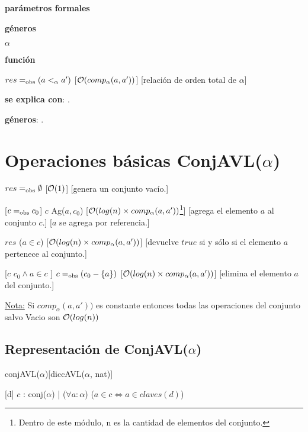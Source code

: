 \begin{Interfaz}
  \textbf{parámetros formales}\parindent\\
  \parbox{1.7cm}{\textbf{géneros}} $\alpha$\\
    \parbox[t]{1.7cm}{\textbf{función}}\parbox[t]{\textwidth-2\parindent-1.7cm}{    	
    {$res =_{\mathrm{obs}} (a <_{\alpha} a')$}
    [$\mathcal{O}(comp_{\alpha}(a, a'))$]
    [relación de orden total de $\alpha$]
    }	
	
  \textbf{se explica con}: .

  \textbf{géneros}: .

  \section*{Operaciones básicas ConjAVL($\alpha$)}

  {$res =_{\mathrm{obs}} \emptyset$}
  [$\mathcal{O}(1)$]
  [genera un conjunto vacío.]

  [$c =_{\mathrm{obs}} c_0$]  
  {$c$ \igobs Ag($a,c_0$)}
  [$\mathcal{O}(log(n) \times comp_{\alpha}(a, a'))$\footnote{Dentro de este módulo, n es la cantidad de elementos del conjunto.}]
  [agrega el elemento $a$ al conjunto $c$.]
  [$a$ se agrega por referencia.]
    
  {$res$ \igobs ($a\in c$) }
  [$\mathcal{O}(log(n) \times comp_{\alpha}(a, a'))$]
  [devuelve $true$ si y sólo si el elemento $a$ pertenece al conjunto.]
  
  [$c$ \igobs $c_0 \land a \in c$ ]
  {$c =_{\mathrm{obs}} (c_0 - \{a\})$}
  [$\mathcal{O}(log(n) \times comp_{\alpha}(a, a'))$]
  [elimina el elemento $a$ del conjunto.] 
  
  \underline{Nota:} Si $comp_{\alpha}(a, a'))$ es constante entonces todas las operaciones del conjunto salvo Vacio son $\mathcal{O}(log(n))$
  \newpage
\end{Interfaz}

\begin{Representacion}
    
  \section*{Representación de ConjAVL($\alpha$)}

  \begin{Estructura}{conjAVL($\alpha$)}[diccAVL($\alpha$, nat)]
  \end{Estructura}
  
  
  [d]{
	$c$ : conj($\alpha$) | ($\forall a: \alpha$) ($a\in c \Leftrightarrow a\in claves(d)$)}
\end{Representacion}


